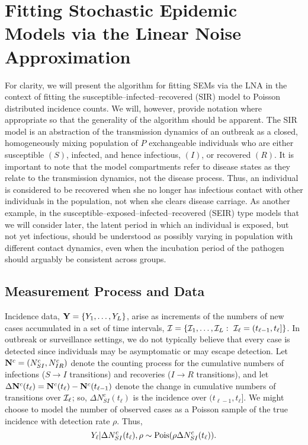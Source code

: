 \section{Fitting Stochastic Epidemic Models via the Linear Noise Approximation}
\label{sec:lna_methods}

For clarity, we will present the algorithm for fitting SEMs via the LNA in the context of fitting the susceptible--infected--recovered (SIR) model to Poisson distributed incidence counts. We will, however, provide notation where appropriate so that the generality of the algorithm should be apparent. The SIR model is an abstraction of the transmission dynamics of an outbreak as a closed, homogeneously mixing population of $ P $ exchangeable individuals who are either susceptible $ (S) $, infected, and hence infectious, $ (I) $, or recovered $ (R) $. It is important to note that the model compartments refer to disease states as they relate to the transmission dynamics, not the disease process. Thus, an individual is considered to be recovered when she no longer has infectious contact with other individuals in the population, not when she clears disease carriage. As another example, in the susceptible--exposed--infected--recovered (SEIR) type models that we will consider later, the latent period in which an individual is exposed, but not yet infectious, should be understood as possibly varying in population with different contact dynamics, even when the incubation period of the pathogen should arguably be consistent across groups.

\subsection{Measurement Process and Data}
\label{subsec:lna_measproc}
Incidence data, $ \mathbf{Y} = \lbrace Y_1,\dots,Y_L\rbrace $,  arise as increments of the numbers of new cases accumulated in a set of time intervals, $ \mathcal{I} = \lbrace\mathcal{I}_1,\dots,\mathcal{I}_L:\ \mathcal{I}_\ell = (t_{\ell-1},t_\ell]\rbrace $. In outbreak or surveillance settings, we do not typically believe that every case is detected since individuals may be asymptomatic or may escape detection. Let $ \mathbf{N}^c = (N^c_{SI}, N^c_{IR}) $ denote the counting process for the cumulative numbers of infections ($ S\rightarrow I $ transitions) and recoveries ($ I\rightarrow R $ transitions), and let $ \Delta \mathbf{N}^c(t_\ell) = \mathbf{N}^c(t_\ell) - \mathbf{N}^c(t_{\ell-1})$ denote the change in cumulative numbers of transitions over $ \mathcal{I}_\ell $; so, $ \Delta N^c_{SI}(t_\ell)$ is the incidence over $ (t_{\ell-1},t_\ell] $. We might choose to model the number of observed cases as a Poisson sample of the true incidence with detection rate $ \rho $. Thus,
\begin{equation}
\label{eqn:incidence_emitprob}
Y_\ell|\Delta N^c_{SI}(t_\ell),\rho \sim \mathrm{Pois}(\rho\Delta N^c_{SI}(t_\ell)).
\end{equation}

